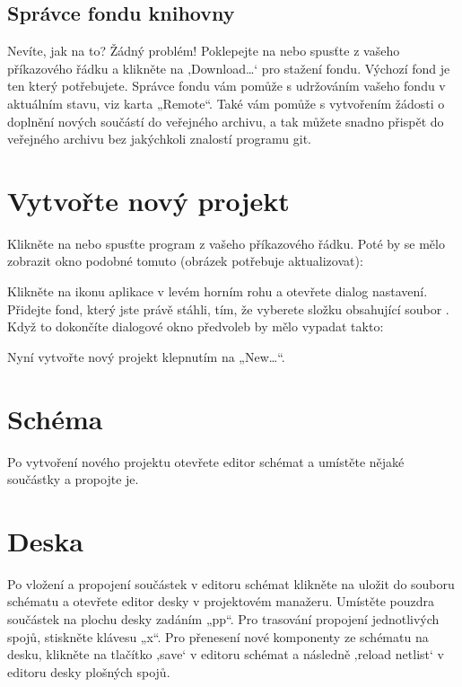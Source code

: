 \documentclass[letterpaper,10pt,czech]{sphinxmanual}
\begin{document}
\subsection{Správce fondu knihovny}
\label{\detokenize{getting-started:spravce-fondu-knihovny}}
Nevíte, jak na to? Žádný problém! Poklepejte na  nebo
spusťte  z vašeho příkazového řádku a klikněte na ‚Download…‘
pro stažení fondu. Výchozí fond  je
ten který potřebujete. Správce fondu vám pomůže s udržováním
vašeho fondu v aktuálním stavu, viz karta „Remote“. Také vám pomůže s
vytvořením žádosti o doplnění nových součástí do veřejného archivu, a tak můžete snadno přispět do veřejného archivu  bez jakýchkoli znalostí programu git.


\section{Vytvořte nový projekt}
\label{\detokenize{getting-started:vytvorte-novy-projekt}}
Klikněte na  nebo spusťte program  z vašeho
příkazového řádku. Poté by se  mělo zobrazit okno podobné tomuto (obrázek
potřebuje aktualizovat):

\noindent{}

Klikněte na ikonu aplikace v levém horním rohu a otevřete
dialog nastavení. Přidejte fond, který jste právě stáhli, tím, že vyberete složku obsahující soubor
. Když to dokončíte dialogové okno předvoleb by mělo vypadat takto:

\noindent{}

Nyní vytvořte nový projekt klepnutím na „New…“.


\section{Schéma}
\label{\detokenize{getting-started:schema}}
Po vytvoření nového projektu otevřete editor schémat a
umístěte nějaké součástky a propojte je.


\section{Deska}
\label{\detokenize{getting-started:deska}}
Po vložení a propojení součástek v editoru schémat klikněte na
uložit do souboru schématu a otevřete editor desky v projektovém
manažeru. Umístěte pouzdra součástek na plochu desky zadáním „pp“. Pro trasování
propojení jednotlivých spojů, stiskněte klávesu „x“. Pro přenesení nové komponenty ze schématu na
desku, klikněte na tlačítko ‚save‘ v editoru schémat a následně ‚reload netlist‘
v editoru desky plošných spojů.
\end{document}
